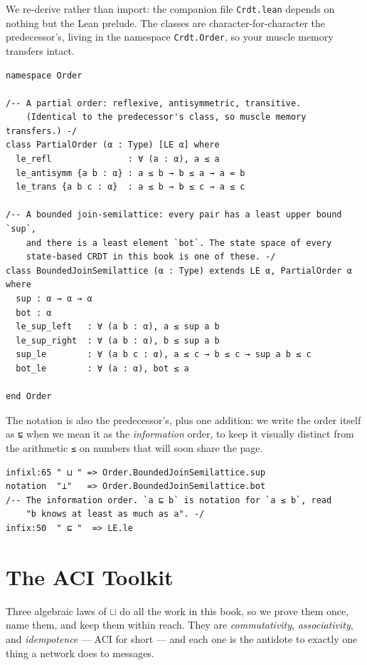 \documentclass[12pt, a4paper, openright]{book}
\theoremstyle{thmstyle}
\theoremstyle{defstyle}
\newcommand{\lc}[1]{\texttt{#1}}
\begin{document}
We re-derive rather than import: the companion file \texttt{Crdt.lean}
depends on nothing but the Lean prelude. The classes are
character-for-character the predecessor's, living in the namespace
\lc{Crdt.Order}, so your muscle memory transfers intact.

\begin{verbatim}
namespace Order

/-- A partial order: reflexive, antisymmetric, transitive.
    (Identical to the predecessor's class, so muscle memory transfers.) -/
class PartialOrder (α : Type) [LE α] where
  le_refl               : ∀ (a : α), a ≤ a
  le_antisymm {a b : α} : a ≤ b → b ≤ a → a = b
  le_trans {a b c : α}  : a ≤ b → b ≤ c → a ≤ c

/-- A bounded join-semilattice: every pair has a least upper bound `sup`,
    and there is a least element `bot`. The state space of every
    state-based CRDT in this book is one of these. -/
class BoundedJoinSemilattice (α : Type) extends LE α, PartialOrder α where
  sup : α → α → α
  bot : α
  le_sup_left   : ∀ (a b : α), a ≤ sup a b
  le_sup_right  : ∀ (a b : α), b ≤ sup a b
  sup_le        : ∀ (a b c : α), a ≤ c → b ≤ c → sup a b ≤ c
  bot_le        : ∀ (a : α), bot ≤ a

end Order
\end{verbatim}

The notation is also the predecessor's, plus one addition: we write the
order itself as \lc{⊑} when we mean it as the \emph{information} order,
to keep it visually distinct from the arithmetic \lc{≤} on numbers that
will soon share the page.

\begin{verbatim}
infixl:65 " ⊔ " => Order.BoundedJoinSemilattice.sup
notation  "⊥"   => Order.BoundedJoinSemilattice.bot
/-- The information order. `a ⊑ b` is notation for `a ≤ b`, read
    "b knows at least as much as a". -/
infix:50  " ⊑ "  => LE.le
\end{verbatim}

\section{The ACI Toolkit}

Three algebraic laws of $\sqcup$ do all the work in this book, so we
prove them once, name them, and keep them within reach. They are
\emph{commutativity}, \emph{associativity}, and \emph{idempotence} ---
ACI for short --- and each one is the antidote to exactly one thing a
network does to messages.
\end{document}
